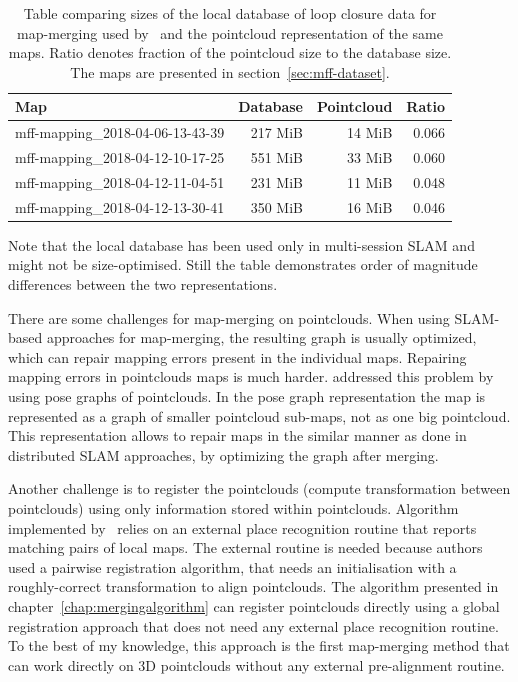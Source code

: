 \begin{table}[b!]
	\label{tabl:rtabmap-db-vs-pointclouds}
	\centering
	\begin{tabular}{lrr D{.}{.}{3}}
	\toprule
	\textbf{Map} & \textbf{Database} & \textbf{Pointcloud} & \textbf{Ratio} \\
	\midrule
	mff-mapping\_2018-04-06-13-43-39 & 217 MiB & 14 MiB & 0.066 \\
	mff-mapping\_2018-04-12-10-17-25 & 551 MiB & 33 MiB & 0.060 \\
	mff-mapping\_2018-04-12-11-04-51 & 231 MiB & 11 MiB & 0.048 \\
	mff-mapping\_2018-04-12-13-30-41 & 350 MiB & 16 MiB & 0.046 \\
	\bottomrule
	\end{tabular}
	\caption{Table comparing sizes of the local database of loop closure data for map-merging used by~\citet{labbe2014online} and the pointcloud representation of the same maps. Ratio denotes fraction of the pointcloud size to the database size. The maps are presented in section~\ref{sec:mff-dataset}.}
\end{table}

Note that the local database has been used only in multi-session \gls{SLAM} and might not be size-optimised. Still the table demonstrates order of magnitude differences between the two representations.

There are some challenges for map-merging on pointclouds. When using \gls{SLAM}-based approaches for map-merging, the resulting graph is usually optimized, which can repair mapping errors present in the individual maps. Repairing mapping errors in pointclouds maps is much harder. \citet{bonanni2017pose} addressed this problem by using pose graphs of pointclouds. In the pose graph representation the map is represented as a graph of smaller pointcloud sub-maps, not as one big pointcloud. This representation allows to repair maps in the similar manner as done in distributed \gls{SLAM} approaches, by optimizing the graph after merging.

Another challenge is to register the pointclouds (compute transformation between pointclouds) using only information stored within pointclouds. Algorithm implemented by~\citet{bonanni2017pose} relies on an external place recognition routine that reports matching pairs of local maps. The external routine is needed because authors used a pairwise registration algorithm, that needs an initialisation with a roughly-correct transformation to align pointclouds. The algorithm presented in chapter~\ref{chap:mergingalgorithm} can register pointclouds directly using a global registration approach that does not need any external place recognition routine. To the best of my knowledge, this approach is the first map-merging method
that can work directly on \gls{3D} pointclouds without any external pre-alignment routine.

